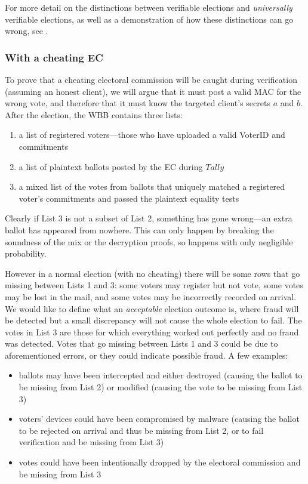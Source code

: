 \documentclass[12pt,a4paper]{article}
\theoremstyle{definition}
\begin{document}

For more detail on the distinctions between verifiable elections and \textit{universally} verifiable elections, as well as a demonstration of how these distinctions can go wrong, see .

\subsubsection{With a cheating EC}
To prove that a cheating electoral commission will be caught during verification (assuming an honest client), we will argue that it must post a valid MAC for the wrong vote, and therefore that it must know the targeted client's secrets $a$ and $b$. After the election, the WBB contains three lists:
\begin{enumerate}
    \item a list of registered voters---those who have uploaded a valid VoterID and commitments
    \item a list of plaintext ballots posted by the EC during $\mathit{Tally}$
    \item a mixed list of the votes from ballots that uniquely matched a registered voter's commitments and passed the plaintext equality tests
\end{enumerate}
Clearly if List 3 is not a subset of List 2, something has gone wrong---an extra ballot has appeared from nowhere. This can only happen by breaking the soundness of the mix or the decryption proofs, so happens with only negligible probability.

However in a normal election (with no cheating) there will be some rows that go missing between Lists 1 and 3: some voters may register but not vote, some votes may be lost in the mail, and some votes may be incorrectly recorded on arrival. We would like to define what an \textit{acceptable} election outcome is, where fraud will be detected but a small discrepancy will not cause the whole election to fail. The votes in List 3 are those for which everything worked out perfectly and no fraud was detected. Votes that go missing between Lists 1 and 3 could be due to aforementioned errors, or they could indicate possible fraud. A few examples:
\begin{itemize}
    \item ballots may have been intercepted and either destroyed (causing the ballot to be missing from List 2) or modified (causing the vote to be missing from List 3)
    \item voters' devices could have been compromised by malware (causing the ballot to be rejected on arrival and thus be missing from List 2, or to fail verification and be missing from List 3)
    \item votes could have been intentionally dropped by the electoral commission and be missing from List 3
\end{itemize}
\end{document}
